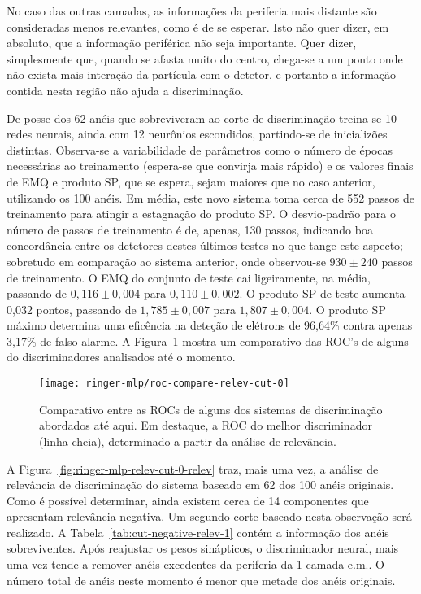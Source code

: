 No caso das outras camadas, as informações da periferia mais distante são
consideradas menos relevantes, como é de se esperar. Isto não quer dizer, em
absoluto, que a informação periférica não seja importante. Quer dizer,
simplesmente que, quando se afasta muito do centro, chega-se a um ponto onde
não exista mais interação da partícula com o detetor, e portanto a informação
contida nesta região não ajuda a discrimina\c{c}ão.

De posse dos 62 anéis que sobreviveram ao corte de discriminação treina-se 10
redes neurais, ainda com 12 neurônios escondidos, partindo-se de inicializões
distintas. Observa-se a variabilidade de parâmetros como o número de épocas
necessárias ao treinamento (espera-se que convirja mais rápido) e os valores
finais de EMQ e produto SP, que se espera, sejam maiores que no caso anterior,
utilizando os 100 anéis. Em média, este novo sistema toma cerca de 552 passos
de treinamento para atingir a estagnação do produto SP. O desvio-padrão para o
número de passos de treinamento é de, apenas, 130 passos, indicando boa
concordância entre os detetores destes últimos testes no que tange este
aspecto; sobretudo em comparação ao sistema anterior, onde observou-se
$930\pm240$ passos de treinamento. O EMQ do conjunto de teste cai
ligeiramente, na média, passando de $0,116\pm0,004$ para $0,110\pm0,002$. O
produto SP de teste aumenta 0,032 pontos, passando de $1,785\pm0,007$ para
$1,807\pm0,004$. O produto SP máximo determina uma eficência na deteção de
elétrons de 96,64\% contra apenas 3,17\% de falso-alarme. A
Figura~\ref{fig:ringer-mlp-relev-cut-0-roc} mostra um comparativo das ROC's de
alguns do discriminadores analisados até o momento.

\begin{figure}
\begin{center}
\texttt{[image: ringer-mlp/roc-compare-relev-cut-0]}
\end{center}
\caption{Comparativo entre as ROCs de alguns dos sistemas de discriminação
abordados até aqui. Em destaque, a ROC do melhor discriminador (linha cheia),
determinado a partir da análise de relevância.}
\label{fig:ringer-mlp-relev-cut-0-roc}
\end{figure}

A Figura~\ref{fig:ringer-mlp-relev-cut-0-relev} traz, mais uma vez, a análise
de relevância de discriminação do sistema baseado em 62 dos 100 anéis
originais. Como é possível determinar, ainda existem cerca de 14 componentes
que apresentam relevância negativa. Um segundo corte baseado nesta observação
será realizado. A Tabela~\ref{tab:cut-negative-relev-1} contém a informação
dos anéis sobreviventes. Após reajustar os pesos sinápticos, o discriminador
neural, mais uma vez tende a remover anéis excedentes da periferia da 1\eira
camada e.m.. O número total de anéis neste momento é menor que metade dos
anéis originais.

